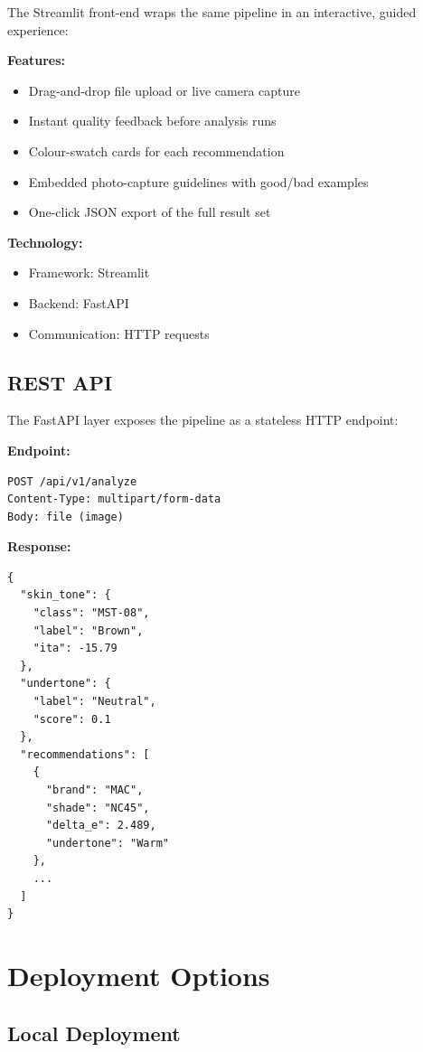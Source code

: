 The Streamlit front-end wraps the same pipeline in an interactive, guided experience:

\textbf{Features:}
\begin{itemize}
    \item Drag-and-drop file upload or live camera capture
    \item Instant quality feedback before analysis runs
    \item Colour-swatch cards for each recommendation
    \item Embedded photo-capture guidelines with good/bad examples
    \item One-click JSON export of the full result set
\end{itemize}

\textbf{Technology:}
\begin{itemize}
    \item Framework: Streamlit
    \item Backend: FastAPI
    \item Communication: HTTP requests
\end{itemize}

\subsection{REST API}

The FastAPI layer exposes the pipeline as a stateless HTTP endpoint:

\textbf{Endpoint:}
\begin{verbatim}
POST /api/v1/analyze
Content-Type: multipart/form-data
Body: file (image)
\end{verbatim}

\textbf{Response:}
\begin{verbatim}
{
  "skin_tone": {
    "class": "MST-08",
    "label": "Brown",
    "ita": -15.79
  },
  "undertone": {
    "label": "Neutral",
    "score": 0.1
  },
  "recommendations": [
    {
      "brand": "MAC",
      "shade": "NC45",
      "delta_e": 2.489,
      "undertone": "Warm"
    },
    ...
  ]
}
\end{verbatim}

\section{Deployment Options}

\subsection{Local Deployment}

